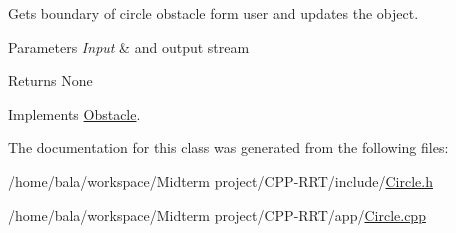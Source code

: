 Gets boundary of circle obstacle form user and updates the object. 


\begin{DoxyParams}{Parameters}
{\em Input} & and output stream \\
\hline
\end{DoxyParams}
\begin{DoxyReturn}{Returns}
None 
\end{DoxyReturn}


Implements \hyperlink{classObstacle_a8915ad90dc24f48df3ff0c38e8c695aa}{Obstacle}.



The documentation for this class was generated from the following files\+:\begin{DoxyCompactItemize}
\item 
/home/bala/workspace/\+Midterm project/\+C\+P\+P-\/\+R\+R\+T/include/\hyperlink{Circle_8h}{Circle.\+h}\item 
/home/bala/workspace/\+Midterm project/\+C\+P\+P-\/\+R\+R\+T/app/\hyperlink{Circle_8cpp}{Circle.\+cpp}\end{DoxyCompactItemize}
